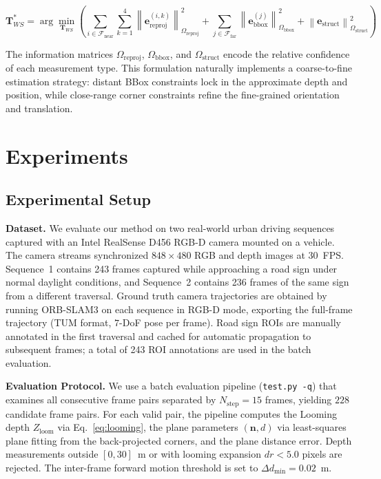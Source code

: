 \documentclass[runningheads]{llncs}
\begin{document}
\begin{equation}
\mathbf{T}_{WS}^* = \arg\min_{\mathbf{T}_{WS}} \left(
\sum_{i \in \mathcal{F}_{\text{near}}} \sum_{k=1}^4
\left\| \mathbf{e}_{\text{reproj}}^{(i,k)} \right\|_{\Omega_{\text{reproj}}}^2 +
\sum_{j \in \mathcal{F}_{\text{far}}}
\left\| \mathbf{e}_{\text{bbox}}^{(j)} \right\|_{\Omega_{\text{bbox}}}^2 +
\left\| \mathbf{e}_{\text{struct}} \right\|_{\Omega_{\text{struct}}}^2
\right)
\label{eq:joint_optimization}
\end{equation}

The information matrices $\Omega_{\text{reproj}}$, $\Omega_{\text{bbox}}$, and
$\Omega_{\text{struct}}$ encode the relative confidence of each measurement type.
This formulation naturally implements a coarse-to-fine estimation strategy: distant
BBox constraints lock in the approximate depth and position, while close-range
corner constraints refine the fine-grained orientation and translation.






\section{Experiments}

\subsection{Experimental Setup}

\noindent\textbf{Dataset.}
We evaluate our method on two real-world urban driving sequences captured with an Intel
RealSense D456 RGB-D camera mounted on a vehicle. The camera streams synchronized
$848 \times 480$ RGB and depth images at 30~FPS. Sequence~1 contains 243 frames
captured while approaching a road sign under normal daylight conditions, and Sequence~2
contains 236 frames of the same sign from a different traversal. Ground truth camera
trajectories are obtained by running ORB-SLAM3 on each sequence in RGB-D mode,
exporting the full-frame trajectory (TUM format, $7$-DoF pose per frame). Road sign
ROIs are manually annotated in the first traversal and cached for automatic propagation
to subsequent frames; a total of 243 ROI annotations are used in the batch evaluation.

\noindent\textbf{Evaluation Protocol.}
We use a batch evaluation pipeline (\texttt{test.py -q}) that examines all consecutive
frame pairs separated by $N_{\text{step}} = 15$ frames, yielding $228$ candidate frame
pairs. For each valid pair, the pipeline computes the Looming depth $Z_{\text{loom}}$
via Eq.~\ref{eq:looming}, the plane parameters $(\mathbf{n}, d)$ via least-squares
plane fitting from the back-projected corners, and the plane distance error. Depth
measurements outside $[0, 30]$~m or with looming expansion $dr < 5.0$ pixels are
rejected. The inter-frame forward motion threshold is set to
$\Delta d_{\min} = 0.02$~m.
\end{document}
